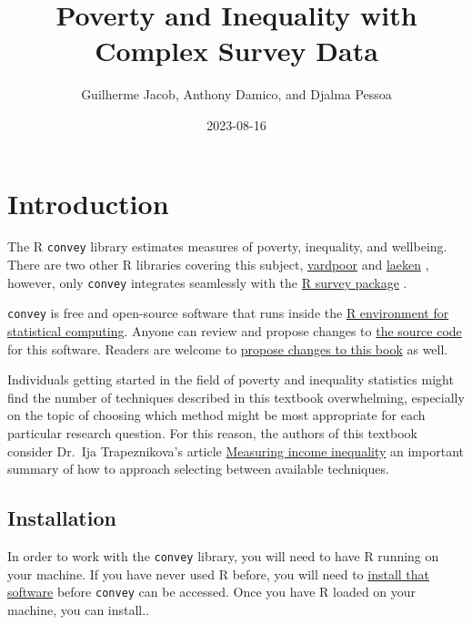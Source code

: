 \documentclass[
]{book}
\title{Poverty and Inequality with Complex Survey Data}
\author{Guilherme Jacob, Anthony Damico, and Djalma Pessoa}
\date{2023-08-16}
\begin{document}
\maketitle

{
\setcounter{tocdepth}{1}
\tableofcontents
}
\hypertarget{introduction}{%
\chapter{Introduction}\label{introduction}}

The R \texttt{convey} library estimates measures of poverty, inequality, and wellbeing. There are two other R libraries covering this subject, \href{https://CRAN.R-project.org/package=vardpoor}{vardpoor} \autocite{R-vardpoor} and \href{https://CRAN.R-project.org/package=laeken}{laeken} \autocite{R-laeken}, however, only \texttt{convey} integrates seamlessly with the \href{https://CRAN.R-project.org/package=survey}{R survey package} \autocite{R-survey-article,R-survey-book,R-survey}.

\texttt{convey} is free and open-source software that runs inside the \href{https://www.r-project.org/}{R environment for statistical computing}. Anyone can review and propose changes to \href{https://github.com/ajdamico/convey}{the source code} for this software. Readers are welcome to \href{https://github.com/guilhermejacob/context/}{propose changes to this book} as well.

Individuals getting started in the field of poverty and inequality statistics might find the number of techniques described in this textbook overwhelming, especially on the topic of choosing which method might be most appropriate for each particular research question. For this reason, the authors of this textbook consider Dr.~Ija Trapeznikova's article \href{https://wol.iza.org/articles/measuring-income-inequality/long}{Measuring income inequality} an important summary of how to approach selecting between available techniques.

\hypertarget{install}{%
\section{Installation}\label{install}}

In order to work with the \texttt{convey} library, you will need to have R running on your machine. If you have never used R before, you will need to \href{https://www.r-project.org/}{install that software} before \texttt{convey} can be accessed. Once you have R loaded on your machine, you can install..
\end{document}
